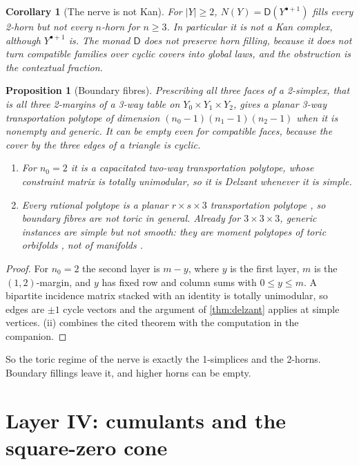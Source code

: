 \documentclass[11pt]{article}
\newtheorem{proposition}[theorem]{Proposition}
\newtheorem{corollary}[theorem]{Corollary}
\theoremstyle{definition}
\theoremstyle{remark}
\newcommand{\D}{\mathsf{D}}
\begin{document}
\begin{corollary}[The nerve is not Kan]\label{cor:notkan}
For $\lvert Y\rvert\ge2$, $N(Y)=\D(Y^{\bullet+1})$ fills every 2-horn but not every $n$-horn for $n\ge3$. In particular it is not
a Kan complex, although $Y^{\bullet+1}$ is. The monad $\D$ does not preserve horn filling, because it does not turn
compatible families over cyclic covers into global laws, and the obstruction is the contextual fraction.
\end{corollary}

\begin{proposition}[Boundary fibres]\label{prop:boundaryfibre}
Prescribing all three faces of a 2-simplex, that is all three 2-margins of a 3-way table on $Y_0\times Y_1\times Y_2$, gives
a planar 3-way transportation polytope of dimension $(n_0-1)(n_1-1)(n_2-1)$ when it is nonempty and generic. It can be empty
even for compatible faces, because the cover by the three edges of a triangle is cyclic.
\begin{enumerate}[label=(\roman*)]
\item For $n_0=2$ it is a capacitated two-way transportation polytope, whose constraint matrix is totally unimodular,
  so it is Delzant whenever it is simple.
\item Every rational polytope is a planar $r\times s\times3$ transportation polytope \cite{DeLoeraOnn2004}, so boundary fibres are
  not toric in general. Already for $3\times3\times3$, generic instances are simple but not smooth: they are moment polytopes
  of toric orbifolds \cite{LermanTolman1997}, not of manifolds \cite[\S10]{Awasthi-Family}.
\end{enumerate}
\end{proposition}
\begin{proof}
For $n_0=2$ the second layer is $m-y$, where $y$ is the first layer, $m$ is the $(1,2)$-margin, and $y$ has fixed row and column
sums with $0\le y\le m$. A bipartite incidence matrix stacked with an identity is totally unimodular, so edges are $\pm1$
cycle vectors and the argument of \cref{thm:delzant} applies at simple vertices. (ii) combines the cited theorem with
the computation in the companion.
\end{proof}

So the toric regime of the nerve is exactly the 1-simplices and the 2-horns. Boundary fillings leave it, and higher
horns can be empty.

\section{Layer IV: cumulants and the square-zero cone}\label{sec:linear}
\end{document}
